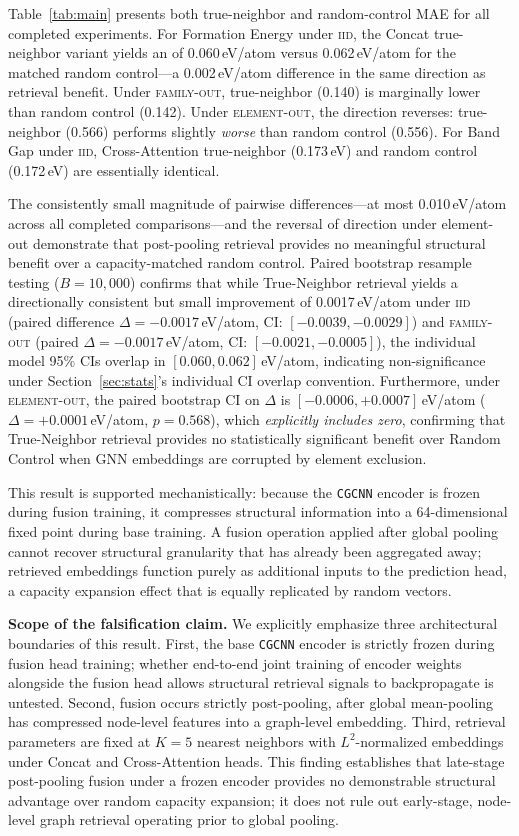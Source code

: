 \documentclass[final,5p,twocolumn,10pt]{elsarticle}
\newcommand{\mae}{\text{MAE}}
\newcommand{\iid}{\textsc{iid}}
\newcommand{\famout}{\textsc{family-out}}
\newcommand{\elout}{\textsc{element-out}}
\newcommand{\cgcnn}{\texttt{CGCNN}}
\begin{document}
Table~\ref{tab:main} presents both true-neighbor and random-control MAE
for all completed experiments. For Formation Energy under \iid{},
the Concat true-neighbor variant yields an \mae{} of 0.060\,eV/atom
versus 0.062\,eV/atom for the matched random control---a 0.002\,eV/atom
difference in the same direction as retrieval benefit.
Under \famout{}, true-neighbor (0.140) is marginally lower than
random control (0.142). Under \elout{}, the direction reverses:
true-neighbor (0.566) performs slightly \emph{worse} than random control
(0.556). For Band Gap under \iid{}, Cross-Attention true-neighbor
(0.173\,eV) and random control (0.172\,eV) are essentially identical.

The consistently small magnitude of pairwise differences---at most 0.010\,eV/atom
across all completed comparisons---and the reversal of direction under element-out
demonstrate that post-pooling retrieval provides no meaningful structural benefit over
a capacity-matched random control. Paired bootstrap resample testing ($B=10{,}000$)
confirms that while True-Neighbor retrieval yields a directionally consistent but
small improvement of 0.0017\,eV/atom under \iid{} (paired difference $\Delta = -0.0017$\,eV/atom,
CI: $[-0.0039, -0.0029]$) and \famout{} (paired $\Delta = -0.0017$\,eV/atom,
CI: $[-0.0021, -0.0005]$), the individual model 95\% CIs overlap in $[0.060, 0.062]$\,eV/atom,
indicating non-significance under Section~\ref{sec:stats}'s individual CI overlap convention.
Furthermore, under \elout{}, the paired bootstrap CI on $\Delta$ is $[-0.0006, +0.0007]$\,eV/atom
($\Delta = +0.0001$\,eV/atom, $p = 0.568$), which \emph{explicitly includes zero}, confirming
that True-Neighbor retrieval provides no statistically significant benefit over Random Control
when GNN embeddings are corrupted by element exclusion.

This result is supported mechanistically: because the \cgcnn{} encoder is frozen during
fusion training, it compresses structural information into a 64-dimensional fixed point
during base training. A fusion operation applied after global pooling cannot recover structural
granularity that has already been aggregated away; retrieved embeddings function purely as
additional inputs to the prediction head, a capacity expansion effect that is equally
replicated by random vectors.

\textbf{Scope of the falsification claim.} We explicitly emphasize three architectural
boundaries of this result. First, the base \cgcnn{} encoder is strictly frozen during
fusion head training; whether end-to-end joint training of encoder weights alongside the
fusion head allows structural retrieval signals to backpropagate is untested. Second,
fusion occurs strictly post-pooling, after global mean-pooling has compressed node-level
features into a graph-level embedding. Third, retrieval parameters are fixed at $K=5$
nearest neighbors with $L^2$-normalized embeddings under Concat and Cross-Attention heads.
This finding establishes that late-stage post-pooling fusion under a frozen encoder provides
no demonstrable structural advantage over random capacity expansion; it does not rule out
early-stage, node-level graph retrieval operating prior to global pooling.
\end{document}
